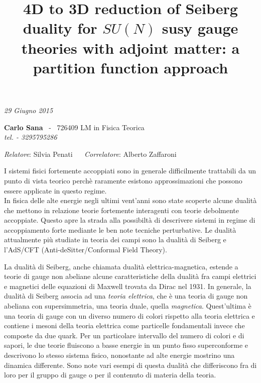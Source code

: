 \documentclass[a4paper,oneside,11pt]{article}
\date{}
\title{\boldmath \textbf{4D to 3D reduction of Seiberg duality for $SU(N)$ susy gauge theories with adjoint matter: a partition function approach }
 }
\author{}
\begin{document}
\maketitle
\vspace*{-2.3cm}
\begin{center}
\textit {29 Giugno 2015} \\
 \end{center}
\vspace{-0.3cm}
	 \textbf{Carlo Sana}  ~-~ 726409  \hfill
 LM in Fisica Teorica 
\\
 \hspace{2cm} \textit{tel. - 3295795286}\\
\vspace{-0.5cm}
\begin{center}
\textit{Relatore}: 
\textsf{Silvia Penati} 
~~
\textit{Correlatore}:
\textsf{Alberto Zaffaroni}

\end{center}

I sistemi fisici fortemente accoppiati sono in generale difficilmente trattabili da un punto di vista teorico perchè raramente esistono approssimazioni che possono essere applicate in questo regime.\\
In fisica delle alte energie negli ultimi vent'anni sono state scoperte alcune dualità che mettono in relazione teorie fortemente interagenti con teorie debolmente accoppiate.
Questo apre la strada alla possibiltà di descrivere sistemi in regime di accoppiamento forte mediante le ben note tecniche perturbative.
Le dualità attualmente più studiate in teoria dei campi sono la dualità di Seiberg e l'AdS/CFT (Anti-deSitter/Conformal Field Theory).

La dualità di Seiberg, anche chiamata dualità elettrica-magnetica, estende a teorie di gauge non abeliane alcune caratteristiche della dualità fra campi elettrici e magnetici delle equazioni di Maxwell trovata da Dirac nel 1931. 
In generale, la dualità di Seiberg associa ad una \emph{teoria elettrica}, che è una teoria di gauge non abeliana con supersimmetria, una teoria duale, quella \emph{magnetica}.
Quest'ultima è una teoria di gauge con un diverso numero di colori rispetto alla teoria elettrica e contiene i mesoni della teoria elettrica come particelle fondamentali invece che composte da due quark.
Per un particolare intervallo del numero di colori e di sapori, le due teorie fluiscono a basse energie in un punto fisso superconforme e descrivono lo stesso sistema fisico, nonostante ad alte energie mostrino una dinamica differente.
Sono note vari esempi di questa dualità che differiscono fra di loro per il gruppo di gauge o per il contenuto di materia della teoria.
\end{document}
